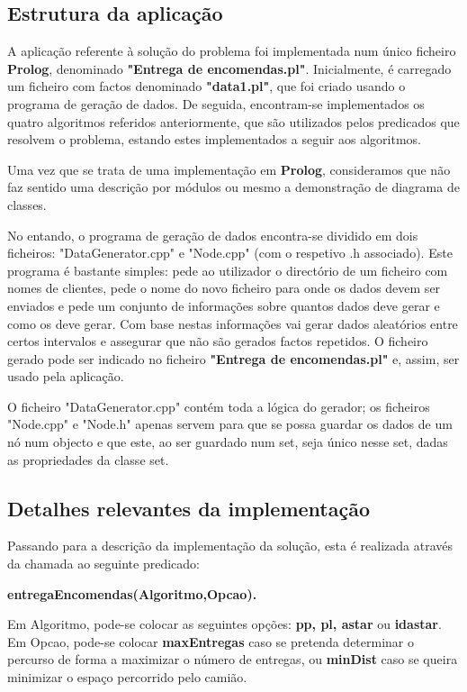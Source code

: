 \documentclass[a4paper]{article}
\begin{document}
\subsection{Estrutura da aplicação} 

A aplicação referente à solução do problema foi implementada num único ficheiro \textbf{Prolog}, denominado \textbf{"Entrega de encomendas.pl"}. Inicialmente, é carregado um ficheiro com factos denominado \textbf{"data1.pl"}, que foi criado usando o programa de geração de dados. De seguida, encontram-se implementados os quatro algoritmos referidos anteriormente, que são utilizados pelos predicados que resolvem o problema, estando estes implementados a seguir aos algoritmos.

Uma vez que se trata de uma implementação em \textbf{Prolog}, consideramos que não faz sentido uma descrição por módulos ou mesmo a demonstração de diagrama de classes.

No entando, o programa de geração de dados encontra-se dividido em dois ficheiros: "DataGenerator.cpp" e "Node.cpp" (com o respetivo .h associado).
Este programa é bastante simples: pede ao utilizador o directório de um ficheiro com nomes de clientes, pede o nome do novo ficheiro para onde os dados devem ser enviados e pede um conjunto de informações sobre quantos dados deve gerar e como os deve gerar. Com base nestas informações vai gerar dados aleatórios entre certos intervalos e assegurar que não são gerados factos repetidos.
O ficheiro gerado pode ser indicado no ficheiro \textbf{"Entrega de encomendas.pl"} e, assim, ser usado pela aplicação.

O ficheiro "DataGenerator.cpp" contém toda a lógica do gerador; os ficheiros "Node.cpp" e "Node.h" apenas servem para que se possa guardar os dados de um nó num objecto e que este, ao ser guardado num set, seja único nesse set, dadas as propriedades da classe set.

\subsection{Detalhes relevantes da implementação} 

Passando para a descrição da implementação da solução, esta é realizada através da chamada ao seguinte predicado:

\centerline{\textbf{entregaEncomendas(Algoritmo,Opcao).}}

Em Algoritmo, pode-se colocar as seguintes opções: \textbf{pp, pl, astar} ou \textbf{idastar}. Em Opcao, pode-se colocar \textbf{maxEntregas} caso se pretenda determinar o percurso de forma a maximizar o número de entregas, ou \textbf{minDist} caso se queira minimizar o espaço percorrido pelo camião.
\end{document}
